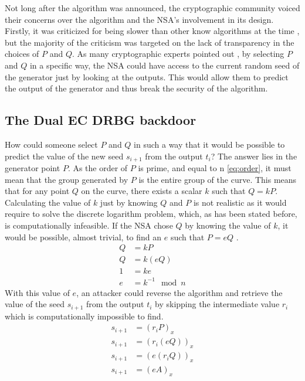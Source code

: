 Not long after the algorithm was announced, the cryptographic community voiced their concerns over the algorithm and the NSA's involvement in its design. Firstly, it was criticized for being slower than other know algorithms at the time \cite{green-2013-dualec-flaws}, but the majority of the criticism was targeted on the lack of transparency in the choices of $P$ and $Q$. As many cryptographic experts pointed out \cite{comments-on-dual-ec-drbg} \cite{ecdsa}, by selecting $P$ and $Q$ in a specific way, the NSA could have access to the current random seed of the generator just by looking at the outputs. This would allow them to predict the output of the generator and thus break the security of the algorithm.

\subsection{The Dual EC DRBG backdoor}
How could someone select $P$ and $Q$ in such a way that it would be possible to predict the value of the new seed $s_{i + 1}$ from the output $t_i$? The answer lies in the generator point $P$. As the order of $P$ is prime, and equal to n \eqref{eq:order}, it must mean that the group generated by $P$ is the entire group of the curve. This means that for any point $Q$ on the curve, there exists a scalar $k$ such that $Q = kP$. Calculating the value of $k$ just by knowing $Q$ and $P$ is not realistic as it would require to solve the discrete logarithm problem, which, as has been stated before, is computationally infeasible. If the NSA chose $Q$ by knowing the value of $k$, it would be possible, almost trivial, to find an $e$ such that $P = eQ$ \cite{backdoor}.
\begin{align}
    Q &= kP \nonumber \\
    Q &= k(eQ) \nonumber \\
    1 &= ke \nonumber \\
    e &= k^{-1} \mod n
\end{align}
With this value of $e$, an attacker could reverse the algorithm and retrieve the value of the seed $s_{i + 1}$ from the output $t_i$ by skipping the intermediate value $r_i$ which is computationally impossible to find.
\begin{align}
    s_{i + 1} &= {(r_iP)}_x \nonumber \\
    s_{i + 1} &= {(r_i(eQ))}_x \nonumber \\
    s_{i + 1} &= {(e(r_iQ))}_x \nonumber \\
    s_{i + 1} &= {(eA)}_x 
\end{align}

